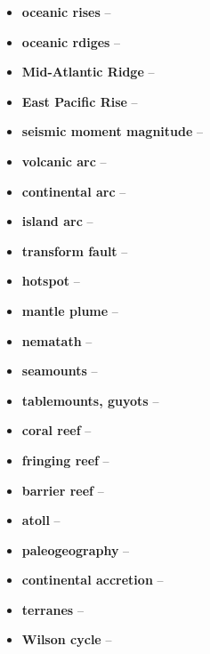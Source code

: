 \begin{itemize}
	\item \textbf{oceanic rises} --
	\item \textbf{oceanic rdiges} --
	\item \textbf{Mid-Atlantic Ridge} --
	\item \textbf{East Pacific Rise} --
	\item \textbf{seismic moment magnitude} --
	\item \textbf{volcanic arc} --
	\item \textbf{continental arc} --
	\item \textbf{island arc} --
	\item \textbf{transform fault} --
	\item \textbf{hotspot} --
	\item \textbf{mantle plume} --
	\item \textbf{nematath} --
	\item \textbf{seamounts} --
	\item \textbf{tablemounts, guyots} --
	\item \textbf{coral reef} --
	\item \textbf{fringing reef} --
	\item \textbf{barrier reef} --
	\item \textbf{atoll} --
	\item \textbf{paleogeography} --
	\item \textbf{continental accretion} --
	\item \textbf{terranes} --
	\item \textbf{Wilson cycle} --
\end{itemize}

